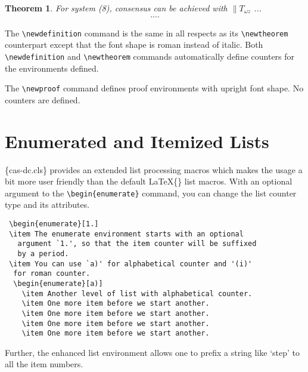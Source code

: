 \documentclass[]{elsarticle} %
\begin{document}
\newtheorem{theorem}{Theorem}

\begin{theorem}
For system (8), consensus can be achieved with 
$\|T_{\omega z}$ ...
\begin{eqnarray}\label{10}
....
\end{eqnarray}
\end{theorem}

The \verb+\newdefinition+ command is the same in all respects as its
\verb+\newtheorem+ counterpart except that the font shape is roman
instead of italic. Both \verb+\newdefinition+ and \verb+\newtheorem+
commands automatically define counters for the environments defined.

The \verb+\newproof+ command defines proof environments with upright
font shape. No counters are defined.

\section[Enumerated ...]{Enumerated and Itemized Lists}

\{cas-dc.cls\} provides an extended list processing macros which makes
the usage a bit more user friendly than the default \LaTeX\{\} list
macros. With an optional argument to the \verb+\begin{enumerate}+
command, you can change the list counter type and its attributes.

\begin{verbatim}
 \begin{enumerate}[1.]
 \item The enumerate environment starts with an optional
   argument `1.', so that the item counter will be suffixed
   by a period.
 \item You can use `a)' for alphabetical counter and '(i)' 
  for roman counter.
  \begin{enumerate}[a)]
    \item Another level of list with alphabetical counter.
    \item One more item before we start another.
    \item One more item before we start another.
    \item One more item before we start another.
    \item One more item before we start another.
\end{verbatim}

Further, the enhanced list environment allows one to prefix a string
like `step' to all the item numbers.
\end{document}

